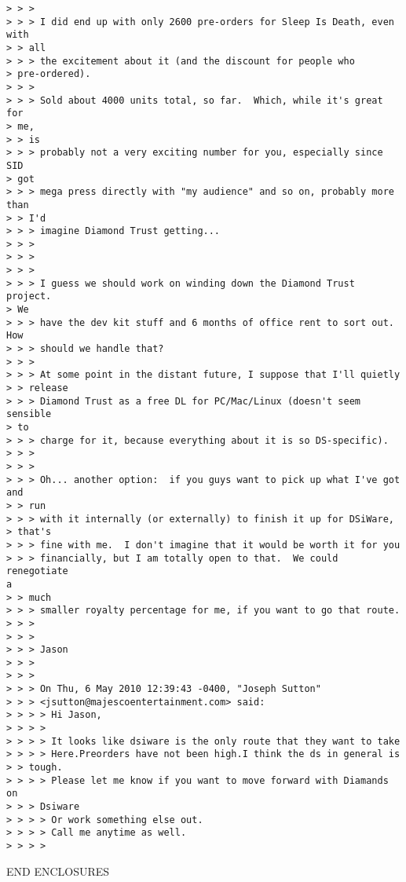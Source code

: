 \documentclass[12pt]{letter}
\begin{document}
{\begin{verbatim}
> > >
> > > I did end up with only 2600 pre-orders for Sleep Is Death, even
with
> > all
> > > the excitement about it (and the discount for people who
> pre-ordered).
> > >
> > > Sold about 4000 units total, so far.  Which, while it's great for
> me,
> > is
> > > probably not a very exciting number for you, especially since SID
> got
> > > mega press directly with "my audience" and so on, probably more
than
> > I'd
> > > imagine Diamond Trust getting...
> > >
> > >
> > >
> > > I guess we should work on winding down the Diamond Trust project.
> We
> > > have the dev kit stuff and 6 months of office rent to sort out.
How
> > > should we handle that?
> > >
> > > At some point in the distant future, I suppose that I'll quietly
> > release
> > > Diamond Trust as a free DL for PC/Mac/Linux (doesn't seem sensible
> to
> > > charge for it, because everything about it is so DS-specific).
> > >
> > >
> > > Oh... another option:  if you guys want to pick up what I've got
and
> > run
> > > with it internally (or externally) to finish it up for DSiWare,
> that's
> > > fine with me.  I don't imagine that it would be worth it for you
> > > financially, but I am totally open to that.  We could renegotiate
a
> > much
> > > smaller royalty percentage for me, if you want to go that route.
> > >
> > >
> > > Jason
> > >
> > >
> > > On Thu, 6 May 2010 12:39:43 -0400, "Joseph Sutton"
> > > <jsutton@majescoentertainment.com> said:
> > > > Hi Jason,
> > > >
> > > > It looks like dsiware is the only route that they want to take
> > > > Here.Preorders have not been high.I think the ds in general is
> > tough.
> > > > Please let me know if you want to move forward with Diamands on
> > > Dsiware
> > > > Or work something else out.
> > > > Call me anytime as well.
> > > >
\end{verbatim}
}


END ENCLOSURES
\end{document}
